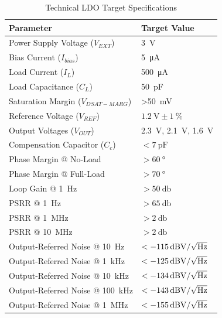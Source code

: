 \documentclass[journal]{IEEEtran}
\begin{document}
\begin{table}[htbp]
    \renewcommand{\arraystretch}{1.2}
    \caption{Technical LDO Target Specifications}
    \label{tab:target_specs}
    \centering
    \begin{tabular}{@{}ll@{}}
        \toprule
        \textbf{Parameter} & \textbf{Target Value} \\
        \midrule
        Power Supply Voltage ($V_{EXT}$) & \qty{3}{\volt} \\
        Bias Current ($I_{bias}$) & \qty{5}{\micro\ampere} \\
        Load Current ($I_{L}$) & \qty{500}{\micro\ampere} \\
        Load Capacitance ($C_{L}$) & \qty{50}{\pico\farad} \\
        Saturation Margin ($V_{DSAT-MARG}$) & \qty{>50}{\milli\volt} \\
        \midrule
        Reference Voltage ($V_{REF}$) & $\qty{1.2}{\volt} \pm \qty{1}{\percent}$ \\
        Output Voltages ($V_{OUT}$) & \qty{2.3}{\volt}, \qty{2.1}{\volt}, \qty{1.6}{\volt} \\
        \midrule
        Compensation Capacitor ($C_c$) & $<\qty{7}{\pico\farad}$ \\
        Phase Margin @ No-Load & $>\qty{60}{\degree}$ \\
        Phase Margin @ Full-Load & $>\qty{70}{\degree}$ \\
        \midrule
        Loop Gain @ \qty{1}{\hertz} & $>\qty{50}{\decibel}$ \\
        PSRR @ \qty{1}{\hertz} & $>\qty{65}{\decibel}$ \\
        PSRR @ \qty{1}{\mega\hertz} & $>\qty{2}{\decibel}$ \\
        PSRR @ \qty{10}{\mega\hertz} & $>\qty{2}{\decibel}$ \\
        \midrule
        Output-Referred Noise @ \qty{10}{\hertz} & $<-\qty{115}{\decibel\volt\slash\sqrt{\Hz}}$ \\
        Output-Referred Noise @ \qty{1}{\kilo\hertz} & $<-\qty{125}{\decibel\volt\slash\sqrt{\Hz}}$ \\
        Output-Referred Noise @ \qty{10}{\kilo\hertz} & $<-\qty{134}{\decibel\volt\slash\sqrt{\Hz}}$ \\
        Output-Referred Noise @ \qty{100}{\kilo\hertz} & $<-\qty{143}{\decibel\volt\slash\sqrt{\Hz}}$ \\
        Output-Referred Noise @ \qty{1}{\mega\hertz} & $<-\qty{155}{\decibel\volt\slash\sqrt{\Hz}}$ \\
        \bottomrule
    \end{tabular}
\end{table}
\end{document}
